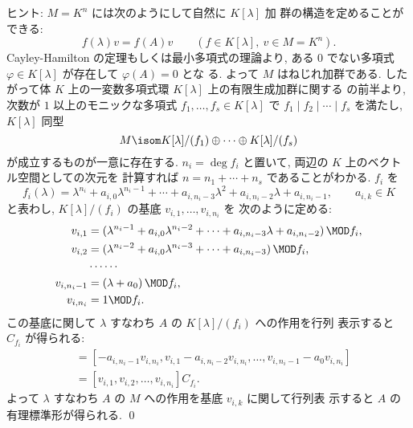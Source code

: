 \documentclass[12pt,twoside]{jarticle}
\begin{document}
\noindent
ヒント: $M=K^n$ には次のようにして自然に $K[\lambda]$ 加
群の構造を定めることができる:
\begin{equation*}
  f(\lambda)v = f(A)v
  \qquad
  (f\in K[\lambda],\ v\in M=K^n).
\end{equation*}
Cayley-Hamilton の定理もしくは最小多項式の理論より, 
ある $0$ でない多項式 $\varphi\in K[\lambda]$ が存在して $\varphi(A)=0$ とな
る.  よって $M$ はねじれ加群である.  
したがって体 $K$ 上の一変数多項式環 $K[\lambda]$ 上の有限生成加群に関する
の前半より, 
次数が $1$ 以上のモニックな多項式 $f_1,\dots,f_s\in K[\lambda]$ 
で $f_1\mid f_2\mid\cdots\mid f_s$ を満たし, $K[\lambda]$ 同型
\begin{equation*}
  M \isom K[\lambda]/(f_1)\oplus\cdots\oplus K[\lambda]/(f_s)
\end{equation*}
が成立するものが一意に存在する. 
$n_i=\deg f_i$ と置いて,
両辺の $K$ 上のベクトル空間としての次元を
計算すれば $n=n_1+\cdots+n_s$ であることがわかる. $f_i$ を
\begin{equation*}
  f_i(\lambda) = 
  \lambda^{n_i} + a_{i,0}\lambda^{n_i-1} + \cdots
  + a_{i,n_i-3}\lambda^2 + a_{i,n_i-2}\lambda + a_{i,n_i-1},
  \qquad
  a_{i,k}\in K
\end{equation*}
と表わし, $K[\lambda]/(f_i)$ の基底 $v_{i,1},\dots,v_{i,n_i}$ を
次のように定める:
\begin{align*}
  v_{i,1} &= (\lambda^{n_i-1}+a_{i,0}\lambda^{n_i-2}+\cdots+a_{i,n_i-3}\lambda
             +a_{i,n_i-2})\,\MOD f_i,
  \\
  v_{i,2} &= (\lambda^{n_i-2}+a_{i,0}\lambda^{n_i-3}+\cdots+a_{i,n_i-3})
             \,\MOD f_i,
  \\
  &\cdots\cdots
  \\
  v_{i,n_i-1} &= (\lambda + a_0) \,\MOD f_i,
  \\
  v_{i,n_i} &= 1 \MOD f_i.
\end{align*}
この基底に関して $\lambda$ すなわち $A$ の $K[\lambda]/(f_i)$ への作用を行列
表示すると $C_{f_i}$ が得られる:
\begin{align*}
  [\lambda v_{i,1},\lambda v_{i,2},\dots,\lambda v_{i,n_i}]
  &
  = [-a_{i,n_i-1}v_{i,n_i}, v_{i,1}-a_{i,n_i-2}v_{i,n_i},\dots,
     v_{i,n_i-1}-a_0v_{i,n_i}]
  \\ &
  = [v_{i,1},v_{i,2},\dots,v_{i,n_i}]C_{f_i}.
\end{align*}
よって $\lambda$ すなわち $A$ の $M$ への作用を基底 $v_{i,k}$ に関して行列表
示すると $A$ の有理標準形が得られる. 
\qed
\end{document}

